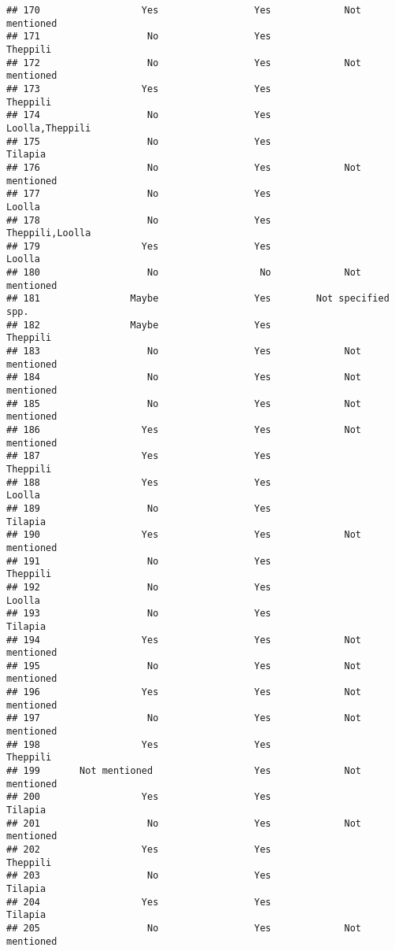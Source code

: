 \documentclass[
]{article}
\begin{document}
\begin{verbatim}
## 170                  Yes                 Yes             Not mentioned
## 171                   No                 Yes                 Theppili 
## 172                   No                 Yes             Not mentioned
## 173                  Yes                 Yes                  Theppili
## 174                   No                 Yes          Loolla,Theppili 
## 175                   No                 Yes                   Tilapia
## 176                   No                 Yes             Not mentioned
## 177                   No                 Yes                   Loolla 
## 178                   No                 Yes          Theppili,Loolla 
## 179                  Yes                 Yes                   Loolla 
## 180                   No                  No             Not mentioned
## 181                Maybe                 Yes        Not specified spp.
## 182                Maybe                 Yes                 Theppili 
## 183                   No                 Yes             Not mentioned
## 184                   No                 Yes             Not mentioned
## 185                   No                 Yes             Not mentioned
## 186                  Yes                 Yes             Not mentioned
## 187                  Yes                 Yes                  Theppili
## 188                  Yes                 Yes                   Loolla 
## 189                   No                 Yes                  Tilapia 
## 190                  Yes                 Yes             Not mentioned
## 191                   No                 Yes                 Theppili 
## 192                   No                 Yes                   Loolla 
## 193                   No                 Yes                  Tilapia 
## 194                  Yes                 Yes             Not mentioned
## 195                   No                 Yes             Not mentioned
## 196                  Yes                 Yes             Not mentioned
## 197                   No                 Yes             Not mentioned
## 198                  Yes                 Yes                 Theppili 
## 199       Not mentioned                  Yes             Not mentioned
## 200                  Yes                 Yes                   Tilapia
## 201                   No                 Yes             Not mentioned
## 202                  Yes                 Yes                  Theppili
## 203                   No                 Yes                  Tilapia 
## 204                  Yes                 Yes                  Tilapia 
## 205                   No                 Yes             Not mentioned

\end{verbatim}
\end{document}
